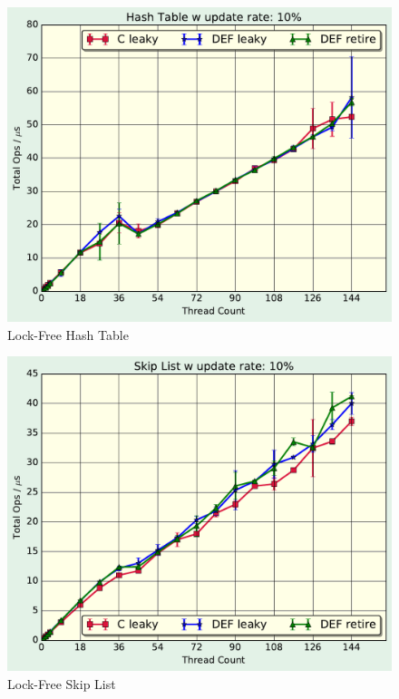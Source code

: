 \begin{figure}
\includegraphics[scale=.4]{gfx/HashTableLight.pdf}
\caption{Lock-Free Hash Table}
\end{figure}

\begin{figure}
\includegraphics[scale=.4]{gfx/SkipListLight.pdf}
\caption{Lock-Free Skip List}
\end{figure}

